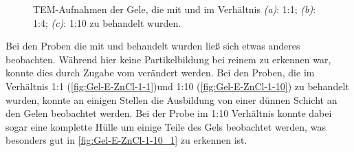 		\begin{figure}[H]
			\centering
			\caption{TEM-Aufnahmen der Gele, die mit  und  im Verhältnis \emph{(a)}: 1:1; \emph{(b)}: 1:4; \emph{(c)}: 1:10  zu  behandelt wurden.}
			\label{fig:Gel-E-CdCl}
		\end{figure}
		
		Bei den Proben die mit  und  behandelt wurden ließ sich etwas anderes beobachten.
		Während hier keine Partikelbildung bei reinem  zu erkennen war, konnte dies durch Zugabe vom  verändert werden.
		Bei den Proben, die im Verhältnis 1:1 (\cref{fig:Gel-E-ZnCl-1-1})und 1:10 (\cref{fig:Gel-E-ZnCl-1-10})  zu  behandelt wurden, konnte an einigen Stellen die Ausbildung von einer dünnen Schicht an den Gelen beobachtet werden.
		Bei der Probe im 1:10 Verhältnis konnte dabei sogar eine komplette Hülle um einige Teile des Gels beobachtet werden, was besonders gut in \cref{fig:Gel-E-ZnCl-1-10_1} zu erkennen ist.
		
